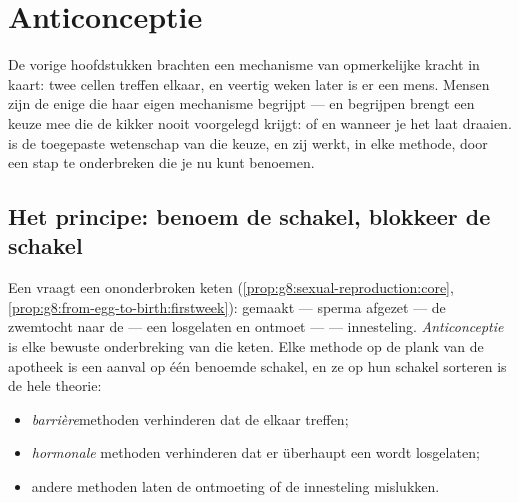 \chapter{Anticonceptie}\label{ch:g8:contraception}

De vorige hoofdstukken brachten een mechanisme van opmerkelijke kracht in
kaart: twee cellen treffen elkaar, en veertig weken later is er een mens.
Mensen zijn de enige  die haar eigen mechanisme begrijpt --- en
begrijpen brengt een keuze mee die de kikker nooit voorgelegd krijgt: of
en wanneer je het laat draaien. \emph{} is de toegepaste
wetenschap van die keuze, en zij werkt, in elke methode, door een stap te
onderbreken die je nu kunt benoemen.

\section{Het principe: benoem de schakel, blokkeer de schakel}

\begin{proposition}\label{prop:g8:contraception:principle}
Een  vraagt een ononderbroken keten
(\cref{prop:g8:sexual-reproduction:core},
\cref{prop:g8:from-egg-to-birth:firstweek}):  gemaakt --- sperma
afgezet --- de zwemtocht naar de  --- een  losgelaten en
ontmoet ---  --- innesteling. \emph{Anticonceptie}
is elke bewuste onderbreking van die keten. Elke methode op de plank van
de apotheek is een aanval op één benoemde schakel, en ze op hun schakel
sorteren is de hele theorie:
\begin{itemize}
  \item \emph{barrière}methoden verhinderen dat de  elkaar treffen;
  \item \emph{hormonale} methoden verhinderen dat er überhaupt een 
        wordt losgelaten;
  \item andere methoden laten de ontmoeting of de innesteling mislukken.
\end{itemize}
\end{proposition}
\admitted

